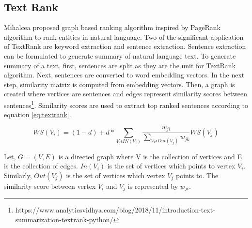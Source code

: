 \subsection{Text Rank}
Mihalcea \cite{mihalcea2004textrank} proposed graph based ranking algorithm inspired by PageRank algorithm to rank entities in natural language. Two of the significant application of TextRank are keyword extraction and sentence extraction. Sentence extraction can be formulated to generate summary of natural language text. To generate summary of a  text, first, sentences are split as they are the unit for TextRank algorithm. Next, sentences are converted to word embedding vectors. In the next step, similarity matrix is computed from embedding vectors. Then, a graph is created where vertices are sentences and edges represent similarity scores between sentences\footnote{https://www.analyticsvidhya.com/blog/2018/11/introduction-text-summarization-textrank-python/}. Similarity scores are used to extract top ranked sentences according to equation \ref{eq:textrank}.

\begin{equation}
\label{eq:textrank}
    WS(V_i) = (1 - d) + d * \sum_{V_j\epsilon IN(V_i) } \frac{w_{ji}}{\sum_{V_k \epsilon Out(V_j)} w_{jk}}  WS(V_j)
\end{equation}

Let, $ G = (V, E)$ is a directed graph where V is the collection of vertices and E is the collection of edges. $In(V_i)$ is the set of vertices which points to vertex $V_i$. Similarly, $Out(V_j)$ is the set of vertices which vertex $V_j$ points to. The similarity score between vertex $V_i$ and $V_j$ is represented by $w_{ji}$. 








